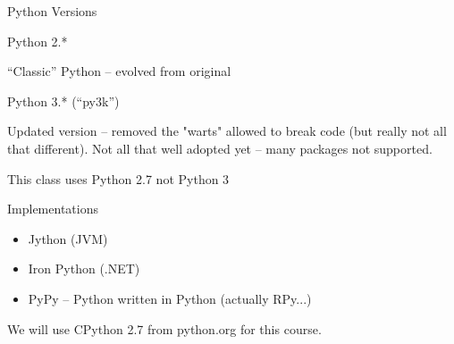 \documentclass{beamer}
\begin{document}
\begin{frame}{Python Versions}

{\Large Python 2.*}

``Classic'' Python -- evolved from original

\vspace{0.25in}
{\Large Python 3.* (``py3k'')}

Updated version -- removed the "warts" allowed to break code (but really not all that different).
Not all that well adopted yet -- many packages not supported.

\vspace{0.25in}
This class uses Python 2.7 not Python 3

\end{frame}


\begin{frame}{Implementations}

\begin{itemize}
    \item Jython (JVM)
    \item Iron Python (.NET)
    \item PyPy -- Python written in Python (actually RPy...)
\end{itemize}

\vspace{0.25in}
  We will use CPython 2.7 from python.org for this course.

\end{frame}
\end{document}
